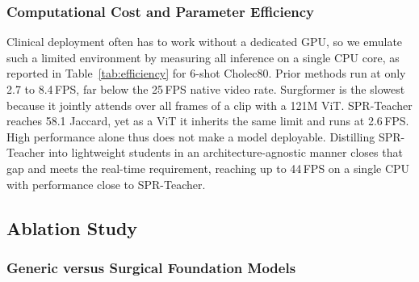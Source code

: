 


\subsubsection{Computational Cost and Parameter Efficiency}
%
%
%

Clinical deployment often has to work without a dedicated GPU, so we emulate such a
limited environment by measuring all inference on a single CPU core, as reported in
Table~\ref{tab:efficiency} for 6-shot Cholec80.
Prior methods run at only 2.7 to 8.4\,FPS, far below the 25\,FPS native video rate.
Surgformer is the slowest because it jointly attends over all frames of a clip with
a 121M ViT.
SPR-Teacher reaches 58.1 Jaccard, yet as a ViT it inherits the same limit
and runs at 2.6\,FPS.
High performance alone thus does not make a model deployable.
Distilling SPR-Teacher into lightweight students in an architecture-agnostic manner
closes that gap and meets the real-time requirement, reaching up to
44\,FPS on a single CPU with performance close to SPR-Teacher.





\subsection{Ablation Study}
\subsubsection{Generic versus Surgical Foundation Models}
\label{sec:exp:fm_analysis}

